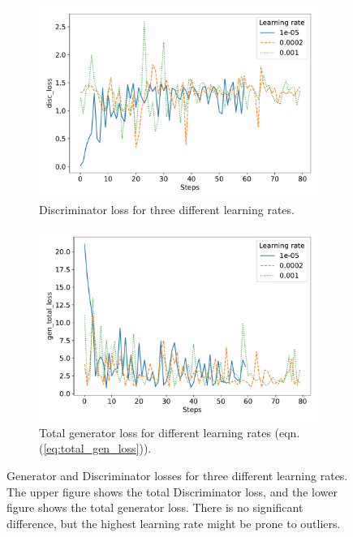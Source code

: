 \begin{figure}
	\centering
	\begin{subfigure}{\linewidth}
		\centering
		\includegraphics[width=\textwidth]{fig/analysis/Plot_learning_rate_disc_loss.pdf}
		\caption{Discriminator loss for three different learning rates. }
		\label{fig:Plot_learning_rate_discloss}
	\end{subfigure}\hfill
	\begin{subfigure}{\linewidth}
		\centering
		\includegraphics[width=\textwidth]{fig/analysis/Plot_learning_rate_gen_total_loss.pdf}
		\caption{Total generator loss for different learning rates (eqn. (\ref{eq:total_gen_loss})).}
		\label{fig:Plot_learning_rate_genloss}
	\end{subfigure}\hfill
	\caption{Generator and Discriminator losses for three different learning rates. The upper figure shows the total Discriminator loss, and the lower figure shows the total generator loss. There is no significant difference, but the highest learning rate might be prone to outliers. }
	\label{fig:Plot_learning_rate_loss}
\end{figure}
